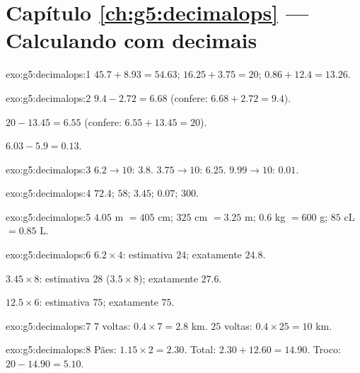 \section*{Capítulo \ref{ch:g5:decimalops} --- Calculando com decimais}

\begin{solution}{exo:g5:decimalops:1}
$45.7 + 8.93 = 54.63$; \quad
$16.25 + 3.75 = 20$; \quad
$0.86 + 12.4 = 13.26$.
\end{solution}

\begin{solution}{exo:g5:decimalops:2}
$9.4 - 2.72 = 6.68$ (confere: $6.68 + 2.72 = 9.4$).

$20 - 13.45 = 6.55$ (confere: $6.55 + 13.45 = 20$).

$6.03 - 5.9 = 0.13$.
\end{solution}

\begin{solution}{exo:g5:decimalops:3}
$6.2 \to 10$: $3.8$. \quad $3.75 \to 10$: $6.25$. \quad
$9.99 \to 10$: $0.01$.
\end{solution}

\begin{solution}{exo:g5:decimalops:4}
$72.4$; \quad $58$; \quad $3.45$; \quad $0.07$; \quad $300$.
\end{solution}

\begin{solution}{exo:g5:decimalops:5}
$4.05$ m $= 405$ cm; \quad $325$ cm $= 3.25$ m; \quad
$0.6$ kg $= 600$ g; \quad $85$ cL $= 0.85$ L.
\end{solution}

\begin{solution}{exo:g5:decimalops:6}
$6.2 \times 4$: estimativa $24$; exatamente $24.8$.

$3.45 \times 8$: estimativa $28$ ($3.5 \times 8$); exatamente $27.6$.

$12.5 \times 6$: estimativa $75$; exatamente $75$.
\end{solution}

\begin{solution}{exo:g5:decimalops:7}
$7$ voltas: $0.4 \times 7 = 2.8$ km. $25$ voltas:
$0.4 \times 25 = 10$ km.
\end{solution}

\begin{solution}{exo:g5:decimalops:8}
Pães: $1.15 \times 2 = 2.30$. Total: $2.30 + 12.60 = 14.90$. Troco:
$20 - 14.90 = 5.10$.
\end{solution}


